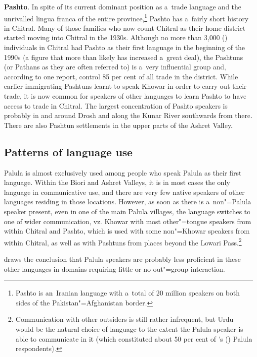 \textbf{Pashto}. In spite of its current dominant position as a~trade language and the unrivalled lingua franca of the entire province,\footnote{Pashto is an~Iranian language with a~total of 20 million speakers on both sides of the Pakistan"=Afghanistan border.} Pashto has a~fairly short history in Chitral. Many of those families who now count Chitral as their home district started moving into Chitral in the 1930s. Although no more than 3,000 (\citealt{decker1992a}) individuals in Chitral had Pashto as their first language in the beginning of the 1990s (a figure that more than likely has increased a~great deal), the Pashtuns (or Pathans as they are often referred to) is a~very influential group and, according to one report, control 85 per cent of all trade in the district. While earlier immigrating Pashtuns learnt to speak Khowar in order to carry out their trade, it is now common for speakers of other languages to learn Pashto to have access to trade in Chitral. The largest concentration of Pashto speakers is probably in and around Drosh and along the Kunar River southwards from there. There are also Pashtun settlements in the upper parts of the Ashret Valley. 


\subsection{Patterns of language use}
\label{subsec:1-3-4}

Palula is almost exclusively used among people who speak Palula as their first language. Within the Biori and Ashret Valleys, it is in most cases the only language in communicative use, and there are very few native speakers of other languages residing in those locations. However, as soon as there is a~non"=Palula speaker present, even in one of the main Palula villages, the language switches to one of wider communication, vz. Khowar with most other"=tongue speakers from within Chitral and Pashto, which is used with some non"=Khowar speakers from within Chitral, as well as with Pashtuns from places beyond the Lowari Pass.\footnote{Communication with other outsiders is still rather infrequent, but Urdu would be the natural choice of language to the extent the Palula speaker is able to communicate in it (which constituted about 50 per cent of \citeauthor{decker1992a}'s (\citeyear{decker1992a}) Palula respondents).} 


\citet{decker1992a} draws the conclusion that Palula speakers are probably less proficient in these other languages in domains requiring little or no out"=group interaction. 


